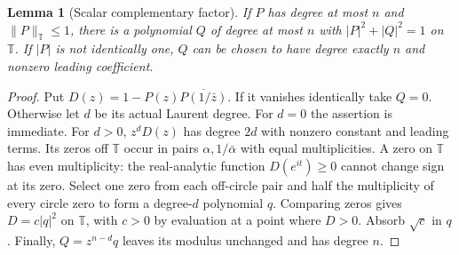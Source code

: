 \documentclass[11pt]{article}
\newtheorem{lemma}[theorem]{Lemma}
\newcommand{\T}{\mathbb T}
\begin{document}
\begin{lemma}[Scalar complementary factor]\label{lem:FR}
If $P$ has degree at most $n$ and $\|P\|_\T\le1$, there is a polynomial
$Q$ of degree at most $n$ with $|P|^2+|Q|^2=1$ on $\T$.
If $|P|$ is not identically one, $Q$ can be chosen to have degree exactly
$n$ and nonzero leading coefficient.
\end{lemma}
\begin{proof}
Put $D(z)=1-P(z)\overline{P(1/\bar z)}$. If it vanishes identically take
$Q=0$. Otherwise let $d$ be its actual Laurent degree. For $d=0$ the
assertion is immediate. For $d>0$, $z^dD(z)$ has degree $2d$ with
nonzero constant and leading terms. Its zeros off $\T$ occur in pairs
$\alpha,1/\bar\alpha$ with equal multiplicities. A zero on $\T$ has
even multiplicity: the real-analytic function $D(e^{it})\ge0$ cannot
change sign at its zero. Select one zero from each off-circle pair and
half the multiplicity of every circle zero to form a degree-$d$
polynomial $q$. Comparing zeros gives $D=c|q|^2$ on $\T$, with $c>0$
by evaluation at a point where $D>0$. Absorb $\sqrt c$ in $q$.
Finally, $Q=z^{n-d}q$ leaves its modulus unchanged and has degree $n$.
\end{proof}
\end{document}
